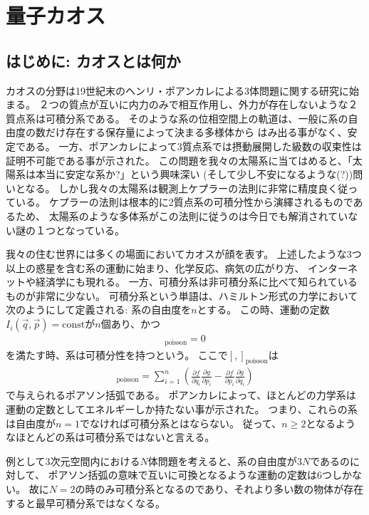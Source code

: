 \section{量子カオス \label{app:quantum_chaos}}

\subsection{はじめに: カオスとは何か}
カオスの分野は19世紀末のヘンリ・ポアンカレによる3体問題に関する研究に始まる\cite{masoliver}。
２つの質点が互いに内力のみで相互作用し、外力が存在しないような２質点系は可積分系である。
そのような系の位相空間上の軌道は、一般に系の自由度の数だけ存在する保存量によって決まる多様体から
はみ出る事がなく、安定である。
一方、ポアンカレによって3質点系では摂動展開した級数の収束性は証明不可能である事が示された。
この問題を我々の太陽系に当てはめると、「太陽系は本当に安定な系か?」という興味深い
(そして少し不安になるような(?))問いとなる。
しかし我々の太陽系は観測上ケプラーの法則に非常に精度良く従っている。
ケプラーの法則は根本的に2質点系の可積分性から演繹されるものであるため、
太陽系のような多体系がこの法則に従うのは今日でも解消されていない謎の１つとなっている。

我々の住む世界には多くの場面においてカオスが顔を表す。
上述したような3つ以上の惑星を含む系の運動に始まり、化学反応、病気の広がり方、
インターネットや経済学にも現れる\cite{masoliver}。
一方、可積分系は非可積分系に比べて知られているものが非常に少ない。
可積分系という単語は、ハミルトン形式の力学において次のようにして定義される:
系の自由度を$n$とする。
この時、運動の定数$I_i(\vec{q}, \vec{p}) = \mathrm{const}$が$n$個あり、かつ
\begin{align}
	[I_i, I_j]_{\mathrm{poisson}} = 0
\end{align}
を満たす時、系は可積分性を持つという。
ここで$[,]_{\mathrm{poisson}}$は
\begin{align}
	[f,g]_{\mathrm{poisson}} = \sum_{i = 1}^{n}\left(
		\frac{\partial f}{\partial q_i}\frac{\partial g}{\partial p_i}
		- \frac{\partial f}{\partial p_i}\frac{\partial g}{\partial q_i}
	\right)
\end{align}
で与えられるポアソン括弧である。
ポアンカレによって、ほとんどの力学系は運動の定数としてエネルギーしか持たない事が示された\cite{masoliver}。
つまり、これらの系は自由度が$n=1$でなければ可積分系とはならない。
従って、$n \geq 2$となるようなほとんどの系は可積分系ではないと言える。

例として3次元空間内における$N$体問題を考えると、系の自由度が$3N$であるのに対して、
ポアソン括弧の意味で互いに可換となるような運動の定数は6つしかない。
故に$N=2$の時のみ可積分系となるのであり、それより多い数の物体が存在すると最早可積分系ではなくなる。

